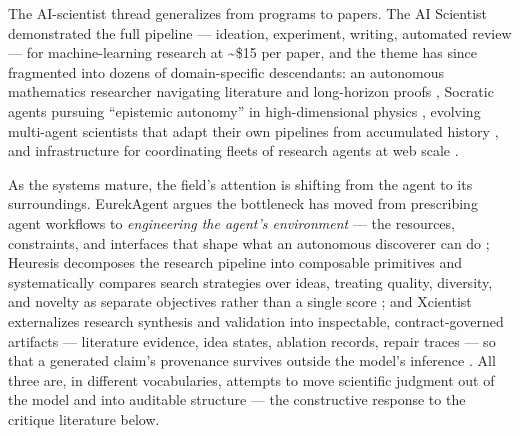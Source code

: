 \documentclass[
  11pt,
]{article}
\begin{document}
The AI-scientist thread generalizes from programs to papers. The AI
Scientist \citep{lu2024aiscientist} demonstrated the full pipeline ---
ideation, experiment, writing, automated review --- for machine-learning
research at \textasciitilde\$15 per paper, and the theme has since
fragmented into dozens of domain-specific descendants: an autonomous
mathematics researcher navigating literature and long-horizon proofs
\citep{feng2026autonomous}, Socratic agents pursuing ``epistemic
autonomy'' in high-dimensional physics \citep{zeng2026socratic},
evolving multi-agent scientists that adapt their own pipelines from
accumulated history \citep{lyu2026evoscientist, zhu2026evomaster}, and
infrastructure for coordinating fleets of research agents at web scale
\citep{guo2026clarus}.

As the systems mature, the field's attention is shifting from the agent
to its surroundings. EurekAgent argues the bottleneck has moved from
prescribing agent workflows to \emph{engineering the agent's
environment} --- the resources, constraints, and interfaces that shape
what an autonomous discoverer can do \citep{xin2026eurekagent}; Heuresis
decomposes the research pipeline into composable primitives and
systematically compares search strategies over ideas, treating quality,
diversity, and novelty as separate objectives rather than a single score
\citep{antoniades2026heuresis}; and Xcientist externalizes research
synthesis and validation into inspectable, contract-governed artifacts
--- literature evidence, idea states, ablation records, repair traces
--- so that a generated claim's provenance survives outside the model's
inference \citep{wang2026externalizing}. All three are, in different
vocabularies, attempts to move scientific judgment out of the model and
into auditable structure --- the constructive response to the critique
literature below.
\end{document}
